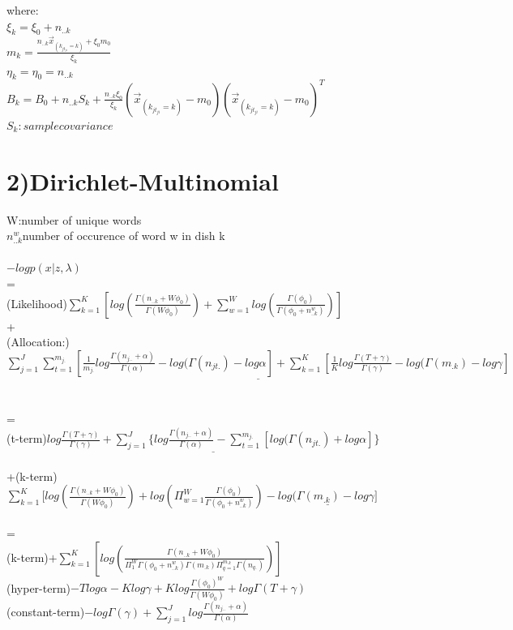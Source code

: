 \documentclass{article}
\begin{document}
\begin{spacing}{1.1}
where:\\
$\xi_{k}=\xi_{0}+n_{..k}$\\
$m_{k}=\frac{n_{..k} \vec x_{(k_{jt_{ji}}=k)}+\xi_{0}m_{0}}{\xi_{k}}$\\
$\eta_{k}=\eta_{0}=n_{..k}$\\
$B_{k}=B_{0}+n_{..k}S_{k}+\frac{n_{..k}\xi_{0}}{\xi_{k}}(\vec x_{(k_{jt_{ji}}=k)}-m_{0})(\vec x_{(k_{jt_{ji}}=k)}-m_{0})^{T}$\\
$S_{k}: sample covariance$\\

\section{2)Dirichlet-Multinomial}
W:number of unique words\\ 
$n_{..k}^{w}$number of occurence of word w in dish k \\ \\
$-log p(x|z,\lambda)$\\ =\\
(Likelihood)$ \sum_{k=1}^{K} [log(\frac{\Gamma(n_{..k}+W\phi_{0})}{\Gamma(W\phi_{0})})+\sum_{w=1}^{W}log(\frac{\Gamma(\phi_{0})}{\Gamma(\phi_{0}+n_{..k}^{w})})]$
\\
+
\\
(Allocation:)$\underline{\sum_{j=1}^{J}\sum_{t=1}^{m_{j.}}[\frac{1}{m_{j.}}log \frac{\Gamma(n_{j..}+\alpha)}{\Gamma(\alpha)} -log(\Gamma(n_{jt.})-log \alpha]+
 \sum_{k=1}^{K} [\frac{1}{K}log \frac{\Gamma(T+\gamma)}{\Gamma(\gamma)} -log(\Gamma(m_{.k})-log \gamma]}$
\\ \\ \\
=\\
(t-term)$ \underline{log \frac{\Gamma(T+\gamma)}{\Gamma(\gamma)}+\sum_{j=1}^{J} \{log \frac{\Gamma(n_{j..}+\alpha)}{\Gamma(\alpha)}-\sum_{t=1}^{m_{j.}}[log(\Gamma(n_{jt.})+log \alpha
]\}}$\\ \\
+(k-term)$ \sum_{k=1}^{K} [log(\frac{\Gamma(n_{..k}+W\phi_{0})}{\Gamma(W\phi_{0})})+log(\Pi_{w=1}^{W}\frac{\Gamma(\phi_{0})}{\Gamma(\phi_{0}+n_{..k}^{w})})
-\underline{log(\Gamma(m_{.k})-log \gamma]}$\\ \\ 
=\\
(k-term)$ +\sum_{k=1}^{K} [log(\frac{\Gamma(n_{..k}+W\phi_{0})}{\Pi_{1}^{W}\Gamma(\phi_{0}+n_{..k}^{w})\Gamma(m_{.k})\Pi_{q=1}^{m_{.k}}\Gamma(n_{q.})})]$\\ 
(hyper-term)$-Tlog\alpha-Klog\gamma+Klog\frac{\Gamma(\phi_{0})^{W}}{\Gamma(W\phi_{0})}+log\Gamma(T+\gamma)$\\
(constant-term)$-log\Gamma(\gamma)+\sum_{j=1}^{J} log \frac{\Gamma(n_{j..}+\alpha)}{\Gamma(\alpha)}$
\\ \\



\end{spacing}
\end{document}
